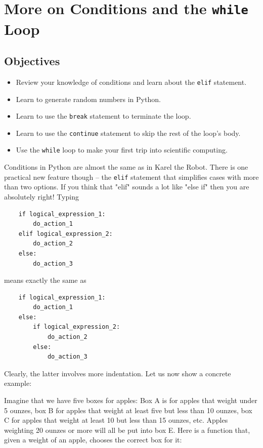 \section{More on Conditions and the {\tt while} Loop} \label{sec:while}

\subsection{Objectives}

\begin{itemize}
\item Review your knowledge of conditions and learn about the {\tt elif} statement.
\item Learn to generate random numbers in Python.
\item Learn to use the {\tt break} statement to terminate the loop.
\item Learn to use the {\tt continue} statement to skip the rest of the loop's body.
\item Use the {\tt while} loop to make your first trip into scientific computing.
\end{itemize}
Conditions in Python are almost the same as in Karel the Robot. There is one practical 
new feature though -- the {\tt elif} statement that simplifies 
cases with more than two options. If you think that "elif" sounds a lot like "else if" then 
you are absolutely right! Typing 

\begin{verbatim}
    if logical_expression_1:
        do_action_1
    elif logical_expression_2:
        do_action_2
    else:
        do_action_3
\end{verbatim}
means exactly the same as

\begin{verbatim}
    if logical_expression_1:
        do_action_1
    else:
        if logical_expression_2:
            do_action_2
        else:
            do_action_3
\end{verbatim}
Clearly, the latter involves more indentation. Let us now show a concrete example:

Imagine that we have five boxes for apples: Box A is for apples that weight under 
5 ounzes, box B for apples that weight at least five but less than 10 ounzes, 
box C for apples that weight at least 10 but less than 15 ounzes, etc. Apples weighting 
20 ounzes or more will all be put into box E. Here is a function that, given 
a weight of an apple, chooses the correct box for it:

